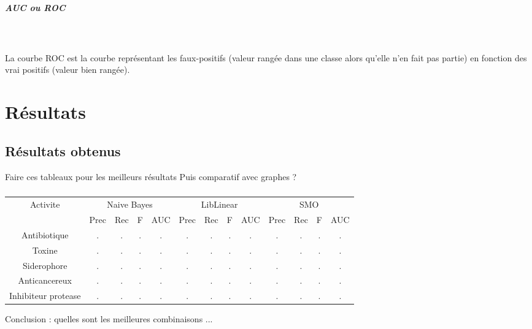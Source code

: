 \documentclass[a4paper,10pt]{report}
\begin{document}
	     \paragraph{AUC ou ROC}\\
		
	     ~\\La courbe ROC est la courbe représentant les faux-positifs (valeur rangée dans une classe alors qu'elle n'en fait pas partie) en fonction des vrai positifs (valeur bien rangée).
	     
	 
   \chapter{Résultats}

	  
      \section{Résultats obtenus}
	 
	  
	  Faire ces tableaux pour les meilleurs résultats
	  Puis comparatif avec graphes ? 
	  \paragraph{}
	   \begin{flushleft}
	    \leftskip -3cm
	    \begin{tabular}{|c|c|c|c|c|c|c|c|c|c|c|c|c|}\hline
	      {Activite} & \multicolumn{4}{|c|}{Naive Bayes} & \multicolumn{4}{|c|}{LibLinear} & \multicolumn{4}{|c|}{SMO} \\\cline{2-13}
	       & Prec & Rec & F & AUC & Prec & Rec & F & AUC & Prec & Rec & F & AUC \\\hline
	      Antibiotique & . & . & . & . & . & . & . & . & . & . & . & . \\\hline
	      Toxine & . & . & . & . & . & . & . & . & . & . & . & .  \\\hline
	      Siderophore & . & . & . & . & . & . & . & . & . & . & . & .  \\\hline
	      Anticancereux & . & . & . & . & . & . & . & . & . & . & . & . \\\hline
	      Inhibiteur protease & . & . & . & . & . & . & . & . & . & . & . & . \\\hline
	    \end{tabular}
	  \end{flushleft}
	  
	  
	  Conclusion : quelles sont les meilleures combinaisons ... 
      
\end{document}
